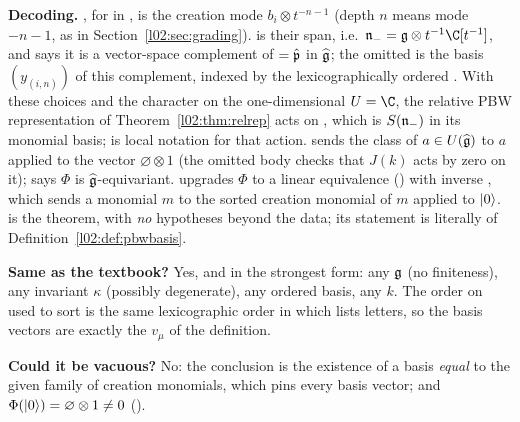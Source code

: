 \begin{dictionary}
\textbf{Decoding.} , for  in , is the creation mode
$b_i\otimes t^{-n-1}$ (depth $n$ means mode $-n-1$, as in Section~\ref{l02:sec:grading}).  is
their span, i.e.\ $\ltwon_- = \ltwog\otimes t^{-1}\C[t^{-1}]$, and  says it is a vector-space
complement of  $=\hat{\mathfrak{p}}$ in $\widehat{\mathfrak{g}}$; the omitted  is the basis
$(y_{(i,n)})$ of this complement, indexed by the lexicographically ordered . With these choices
and the character  on the one-dimensional $U = \C$, the relative PBW representation of
Theorem~\ref{l02:thm:relrep} acts on , which is $S(\mathfrak{n}_-)$ in its monomial
basis;  is local notation for that action.  sends the class of $a\in U(\widehat{\mathfrak{g}})$ to $a$
applied to the vector $\varnothing\otimes1$ (the omitted body checks that $J(k)$ acts by zero on it);
 says $\Phi$ is $\widehat{\mathfrak{g}}$-equivariant.  upgrades $\Phi$ to a linear equivalence
() with inverse , which sends a monomial $m$ to the sorted creation monomial of $m$
applied to $|0\rangle$.  is the theorem, with \emph{no} hypotheses beyond the data; its
statement is literally  of Definition~\ref{l02:def:pbwbasis}.

\textbf{Same as the textbook?} Yes, and in the strongest form: any $\mathfrak{g}$ (no finiteness), any invariant
$\kappa$ (possibly degenerate), any ordered basis, any $k$. The order on  used to sort is the
same lexicographic order in which  lists letters, so the basis vectors are exactly the
$v_\mu$ of the definition.

\textbf{Could it be vacuous?} No: the conclusion is the existence of a basis \emph{equal} to the given
family of creation monomials, which pins every basis vector; and $\Phi(|0\rangle) = \varnothing\otimes1\ne0$
().
\end{dictionary}

